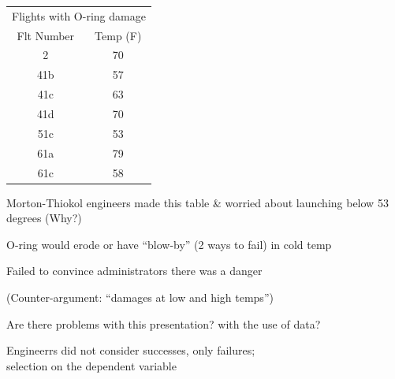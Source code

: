 \documentclass[pdflatex,landscape,titlepage]{foils}
\begin{document}
\begin{center}
\begin{tabular}{cc}
\toprule
\multicolumn{2}{c}{Flights with O-ring damage}\\
Flt Number      &       Temp (F)        \\
\midrule
2       &       70      \\
41b     &       57      \\
41c     &       63      \\
41d     &       70      \\
51c     &       53      \\
61a     &       79      \\
61c     &       58      \\
\bottomrule
\end{tabular}
\end{center}

Morton-Thiokol engineers made this table \& worried about launching below 53 degrees (Why?)

O-ring would erode or have ``blow-by'' (2 ways to fail) in cold temp

Failed to convince administrators there was a danger

(Counter-argument:  ``damages at low and high temps'')

Are there problems with this presentation?  with the use of data?


Engineerrs did not consider successes, only failures; \\
selection on the dependent variable
\end{document}
